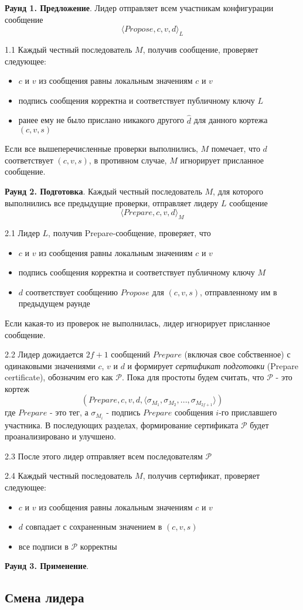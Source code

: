 \textbf{Раунд 1. Предложение}. Лидер отправляет всем участникам конфигурации сообщение 
\[ \langle Propose, c, v, d \rangle_L \]

1.1 Каждый честный последователь $M$, получив сообщение, проверяет следующее:
\begin{itemize}
\item $c$ и $v$ из сообщения равны локальным значениям $c$ и $v$
\item подпись сообщения корректна и соответствует публичному ключу $L$
\item ранее ему не было прислано никакого другого $\hat d$ для данного кортежа $(c, v, s)$
\end{itemize}

Если все вышеперечисленные проверки выполнились, $M$ помечает, что $d$ соответствует $(c, v, s)$, в противном случае, $M$ игнорирует присланное сообщение. 

\textbf{Раунд 2. Подготовка}. Каждый честный последователь $M$, для которого выполнились все предыдущие проверки, отправляет лидеру $L$ сообщение 
\[ \langle Prepare, c, v, d \rangle_M \]

2.1 Лидер $L$, получив Prepare-сообщение, проверяет, что
\begin{itemize}
\item $c$ и $v$ из сообщения равны локальным значениям $c$ и $v$
\item подпись сообщения корректна и соответствует публичному ключу $M$
\item $d$ соответствует сообщению $Propose$ для $(c, v, s)$, отправленному им в предыдущем раунде
\end{itemize}
Если какая-то из проверок не выполнилась, лидер игнорирует присланное сообщение. 

2.2 Лидер дожидается $2f+1$ сообщений $Prepare$ (включая свое собственное) с одинаковыми значениями $c$, $v$ и $d$ и формирует \textit{сертификат подготовки} (Prepare certificate), обозначим его как $\mathcal{P}$.
Пока для простоты будем считать, что $\mathcal{P}$ - это кортеж
$$(Prepare, c, v, d, \langle \sigma_{M_1}, \sigma_{M_2}, ..., \sigma_{M_{2f+1}} \rangle)$$
где $Prepare$ - это тег, а $\sigma_{M_i}$ - подпись $Prepare$ сообщения $i$-го приславшего участника. 
В последующих разделах, формирование сертификата $\mathcal{P}$ будет проанализировано и улучшено.

2.3 После этого лидер отправляет всем последователям  $\mathcal{P}$

2.4 Каждый честный последователь $M$, получив сертификат, проверяет следующее:
\begin{itemize}
\item $c$ и $v$ из сообщения равны локальным значениям $c$ и $v$
\item $d$ совпадает с сохраненным значением в $(c, v, s)$
\item все подписи в $\mathcal{P}$ корректны
\end{itemize}

\textbf{Раунд 3. Применение}. 

\subsection{Смена лидера}